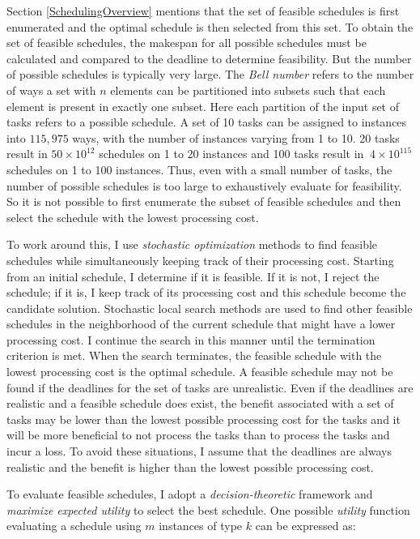 \documentclass[12pt]{report}
\begin{document}
Section \ref{SchedulingOverview} mentions that the set of feasible schedules is first enumerated and the optimal schedule is then selected from this set.
To obtain the set of feasible schedules, the makespan for all possible schedules must be calculated and compared to the deadline to determine feasibility.
But the number of possible schedules is typically very large.
The \textit{Bell number} \cite{mathworld:bellnumber} refers to the number of ways a set with $n$ elements can be partitioned into subsets such that each element is present in exactly one subset.
Here each partition of the input set of tasks refers to a possible schedule.
A set of 10 tasks can be assigned to instances into $115,975$ ways, with the number of instances varying from 1 to 10.
20 tasks result in $50 \times 10^{12}$ schedules on 1 to 20 instances and 100 tasks result in $~ 4 \times 10^{115}$ schedules on 1 to 100 instances.
Thus, even with a small number of tasks, the number of possible schedules is too large to exhaustively evaluate for feasibility.
So it is not possible to first enumerate the subset of feasible schedules and then select the schedule with the lowest processing cost.

To work around this, I use \textit{stochastic optimization} methods to find feasible schedules while simultaneously keeping track of their processing cost.
Starting from an initial schedule, I determine if it is feasible.
If it is not, I reject the schedule; if it is, I keep track of its processing cost and this schedule become the candidate solution.
Stochastic local search methods are used to find other feasible schedules in the neighborhood of the current schedule that might have a lower processing cost.
I continue the search in this manner until the termination criterion is met.
When the search terminates, the feasible schedule with the lowest processing cost is the optimal schedule.
A feasible schedule may not be found if the deadlines for the set of tasks are unrealistic.
Even if the deadlines are realistic and a feasible schedule does exist, the benefit associated with a set of tasks may be lower than the lowest possible processing cost for the tasks and it will be more beneficial to not process the tasks than to process the tasks and incur a loss.
To avoid these situations, I assume that the deadlines are always realistic and the benefit is higher than the lowest possible processing cost.

To evaluate feasible schedules, I adopt a \textit{decision-theoretic} framework and \textit{maximize expected utility} \cite{BernadoSmith} to select the best schedule.
One possible \textit{utility} function evaluating a schedule using $m$ instances of type $k$ can be expressed as:
\end{document}
